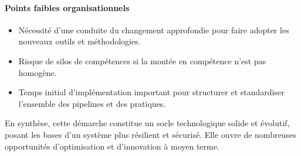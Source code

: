\paragraph{Points faibles organisationnels}
\begin{itemize}
	\item Nécessité d’une conduite du changement approfondie pour faire adopter les nouveaux outils et méthodologies.
	\item Risque de silos de compétences si la montée en compétence n’est pas homogène.
	\item Temps initial d’implémentation important pour structurer et standardiser l’ensemble des pipelines et des pratiques.
\end{itemize}

En synthèse, cette démarche constitue un socle technologique solide et évolutif, posant les bases d’un système plus résilient et sécurisé. Elle ouvre de nombreuses opportunités d’optimisation et d’innovation à moyen terme.
